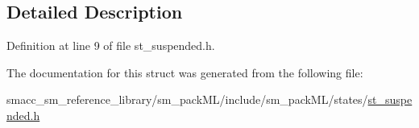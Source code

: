 \subsection{Detailed Description}


Definition at line 9 of file st\+\_\+suspended.\+h.



The documentation for this struct was generated from the following file\+:\begin{DoxyCompactItemize}
\item 
smacc\+\_\+sm\+\_\+reference\+\_\+library/sm\+\_\+pack\+M\+L/include/sm\+\_\+pack\+M\+L/states/\hyperlink{st__suspended_8h}{st\+\_\+suspended.\+h}\end{DoxyCompactItemize}
